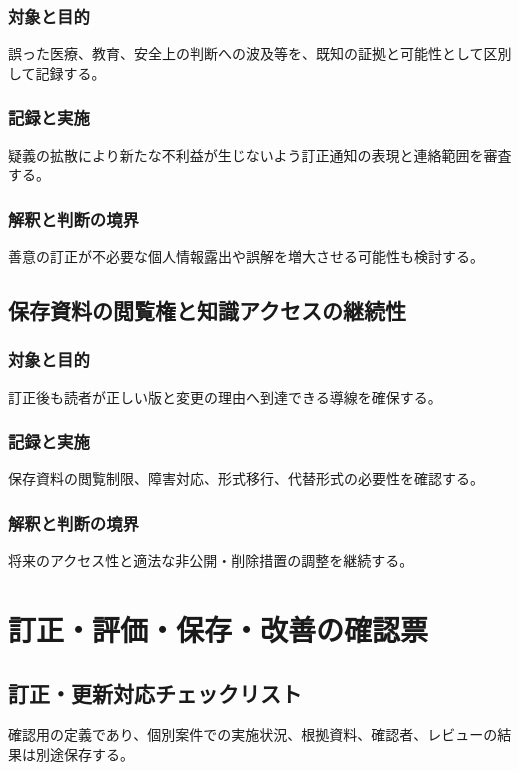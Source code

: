 \documentclass[a4paper,11pt]{article}
\begin{document}
\subsubsection{対象と目的}
\par 誤った医療、教育、安全上の判断への波及等を、既知の証拠と可能性として区別して記録する。\par\medskip
\subsubsection{記録と実施}
\par 疑義の拡散により新たな不利益が生じないよう訂正通知の表現と連絡範囲を審査する。\par\medskip
\subsubsection{解釈と判断の境界}
\par 善意の訂正が不必要な個人情報露出や誤解を増大させる可能性も検討する。\par\medskip
\subsection{保存資料の閲覧権と知識アクセスの継続性}
\subsubsection{対象と目的}
\par 訂正後も読者が正しい版と変更の理由へ到達できる導線を確保する。\par\medskip
\subsubsection{記録と実施}
\par 保存資料の閲覧制限、障害対応、形式移行、代替形式の必要性を確認する。\par\medskip
\subsubsection{解釈と判断の境界}
\par 将来のアクセス性と適法な非公開・削除措置の調整を継続する。\par\medskip
\section{訂正・評価・保存・改善の確認票}
\subsection{訂正・更新対応チェックリスト}
\par 確認用の定義であり、個別案件での実施状況、根拠資料、確認者、レビューの結果は別途保存する。\par\medskip
\end{document}
